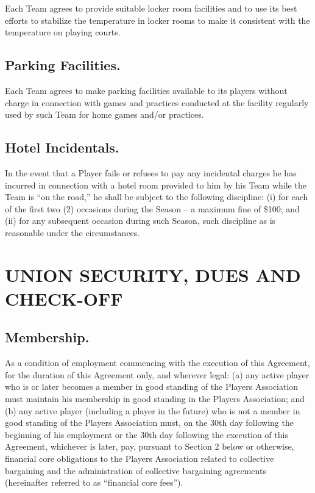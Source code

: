 \documentclass[
]{book}
\begin{document}
Each Team agrees to provide suitable locker room facilities and to use its best efforts to stabilize the temperature in locker rooms to make it consistent with the temperature on playing courts.

\hypertarget{parking-facilities.}{%
\section{Parking Facilities.}\label{parking-facilities.}}

Each Team agrees to make parking facilities available to its players without charge in connection with games and practices conducted at the facility regularly used by such Team for home games and/or practices.

\hypertarget{hotel-incidentals.}{%
\section{Hotel Incidentals.}\label{hotel-incidentals.}}

In the event that a Player fails or refuses to pay any incidental charges he has incurred in connection with a hotel room provided to him by his Team while the Team is ``on the road,'' he shall be subject to the following discipline: (i) for each of the first two (2) occasions during the Season -- a maximum fine of \$100; and (ii) for any subsequent occasion during such Season, such discipline as is reasonable under the circumstances.

\hypertarget{union-security-dues-and-check-off}{%
\chapter{UNION SECURITY, DUES AND CHECK-OFF}\label{union-security-dues-and-check-off}}


\hypertarget{membership.}{%
\section{Membership.}\label{membership.}}

As a condition of employment commencing with the execution of this Agreement, for the duration of this Agreement only, and wherever legal: (a) any active player who is or later becomes a member in good standing of the Players Association must maintain his membership in good standing in the Players Association; and (b) any active player (including a player in the future) who is not a member in good standing of the Players Association must, on the 30th day following the beginning of his employment or the 30th day following the execution of this Agreement, whichever is later, pay, pursuant to Section 2 below or otherwise, financial core obligations to the Players Association related to collective bargaining and the administration of collective bargaining agreements (hereinafter referred to as ``financial core fees'').
\end{document}
